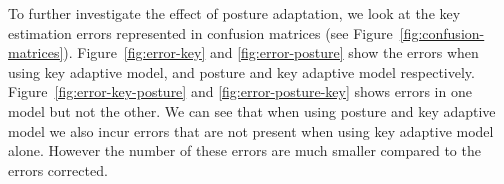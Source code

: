 \documentclass{sigchi}
\begin{document}
To further investigate the effect of posture adaptation, we look at the key estimation
errors represented in confusion matrices (see Figure~\ref{fig:confusion-matrices}). Figure~\ref{fig:error-key} and \ref{fig:error-posture}
show the errors when using key adaptive model, and posture and key adaptive model respectively. Figure~\ref{fig:error-key-posture}
and \ref{fig:error-posture-key} shows errors in one model but not the other.
We can see that when using posture and key adaptive model we also incur errors
that are not present when using key adaptive model alone. However the number of these
errors are much smaller compared to the errors corrected.

\begin{figure}[tb]
  \centering
\end{figure}
\end{document}
